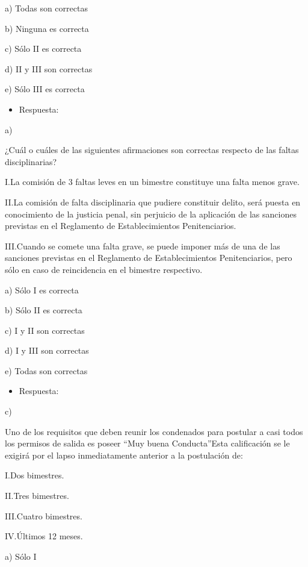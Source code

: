 \documentclass[letterpaper, 11pt]{article}
\begin{document}
a) Todas son correctas

b) Ninguna es correcta

c) Sólo II es correcta

d) II y III son correctas

e) Sólo III es correcta


\begin{itemize}
\item Respuesta:
\end{itemize}

a)


¿Cuál o cuáles de las siguientes afirmaciones son correctas respecto
de las faltas disciplinarias?

I.La comisión de 3 faltas leves en un bimestre constituye una falta
menos grave.



II.La comisión de falta disciplinaria que pudiere constituir delito,
será puesta en conocimiento de la justicia penal, sin perjuicio de la
aplicación de las sanciones previstas en el Reglamento de
Establecimientos Penitenciarios.



III.Cuando se comete una falta grave, se puede imponer más de una de
las sanciones previstas en el Reglamento de Establecimientos
Penitenciarios, pero sólo en caso de reincidencia en el bimestre
respectivo.




a) Sólo I es correcta

b) Sólo II es correcta

c) I y II son correctas

d) I y III son correctas

e) Todas son correctas


\begin{itemize}
\item Respuesta:
\end{itemize}

c)


Uno de los requisitos que deben reunir los condenados para postular a
casi todos los permisos de salida es poseer “Muy buena Conducta”Esta
calificación se le exigirá por el lapso inmediatamente anterior a la
postulación de:


I.Dos bimestres.


II.Tres bimestres.


III.Cuatro bimestres.


IV.Últimos 12 meses.


a) Sólo I
\end{document}
